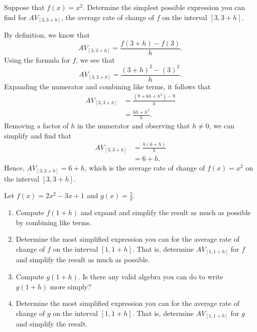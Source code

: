 \documentclass{ximera}
\begin{document}
\begin{example}
Suppose that \(f(x) = x^2\).  Determine the simplest possible expression you can find for \(AV_{[3,3+h]}\), the average rate of change of \(f\) on the interval \([3,3+h]\).

\begin{explanation}
By definition, we know that%
\begin{equation*}
AV_{[3,3+h]} = \frac{f(3+h)-f(3)}{h}.
\end{equation*}
Using the formula for \(f\), we see that%
\begin{equation*}
AV_{[3,3+h]} = \frac{(3+h)^2-(3)^2}{h}.
\end{equation*}
Expanding the numerator and combining like terms, it follows that%
\begin{align*}
AV_{[3,3+h]} &= \frac{(9+6h+h^2)-9}{h}\\
&= \frac{6h + h^2}{h}\text{.}
\end{align*}
Removing a factor of \(h\) in the numerator and observing that \(h \ne 0\), we can simplify and find that%
\begin{align*}
AV_{[3,3+h]} &= \frac{h(6 + h)}{h}\\
&= 6+h\text{.}
\end{align*}
Hence, \(AV_{[3,3+h]} = 6+h\), which is the average rate of change of \(f(x) = x^2\) on the interval \([3,3+h]\).  
\end{explanation}

\end{example}

\begin{exploration}
Let \(f(x) = 2x^2 - 3x + 1\) and \(g(x) = \frac{5}{x}\).%
\begin{enumerate}[label=\alph*.]
\item Compute \(f(1+h)\) and expand and simplify the result as much as possible by combining like terms.
\item Determine the most simplified expression you can for the average rate of change of \(f\) on the interval \([1,1+h]\). That is, determine \(AV_{[1,1+h]}\) for \(f\) and simplify the result as much as possible.
\item Compute \(g(1+h)\). Is there any valid algebra you can do to write \(g(1+h)\) more simply?
\item Determine the most simplified expression you can for the average rate of change of \(g\) on the interval \([1,1+h]\). That is, determine \(AV_{[1,1+h]}\) for \(g\) and simplify the result.
\end{enumerate}
\end{exploration}
\end{document}
